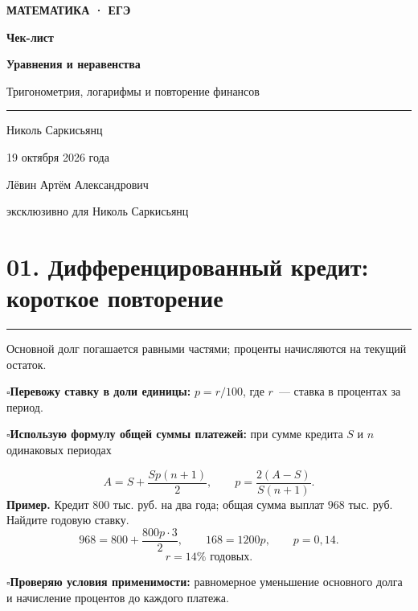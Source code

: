 \documentclass[a4paper,12pt]{article}
\newcommand{\sectionnote}[1]{{\small\color{softgray}#1\par}}
\newcommand{\criterion}[1]{\textcolor{darkaccent}{\bfseries #1}}
\newcommand{\checkitem}[1]{\par\noindent\textcolor{accent}{\(\square\)}\enspace #1\par}
\newcommand{\lessonsection}[1]{\Needspace{5\baselineskip}\section*{\color{darkaccent}#1}\vspace{-5pt}\noindent\textcolor{accent}{\rule{25mm}{0.7pt}}\par\vspace{1pt}}
\begin{document}
\thispagestyle{empty}
\begin{titlepage}
\begin{center}
\vspace*{27mm}
{\large\color{darkaccent}\bfseries МАТЕМАТИКА · ЕГЭ}\par
\vspace{27mm}
{\Huge\bfseries Чек-лист}\par
\vspace{9mm}
{\LARGE\color{darkaccent}\bfseries Уравнения и неравенства}\par
\vspace{4mm}
{\Large Тригонометрия, логарифмы и повторение финансов}\par
\vspace{20mm}
\textcolor{accent}{\rule{34mm}{0.7pt}}\par
\vspace{15mm}
{\large Николь Саркисьянц}\par
\vspace{6mm}
{\large 19 октября 2026 года}\par
\vfill
{\small\color{textgray}Лёвин Артём Александрович}\par
{\small\color{textgray}эксклюзивно для Николь Саркисьянц}\par
\vspace{17mm}
\end{center}
\end{titlepage}

\lessonsection{01. Дифференцированный кредит: короткое повторение}
\sectionnote{Основной долг погашается равными частями; проценты начисляются на текущий остаток.}
\checkitem{\criterion{Перевожу ставку в доли единицы:} \(p=r/100\), где \(r\)~--- ставка в процентах за период.}
\checkitem{\criterion{Использую формулу общей суммы платежей:} при сумме кредита \(S\) и \(n\) одинаковых периодах}
\[
\boxed{A=S+\frac{Sp(n+1)}2},\qquad
\boxed{p=\frac{2(A-S)}{S(n+1)}}.
\]
\textbf{Пример.} Кредит \(800\) тыс. руб. на два года; общая сумма выплат \(968\) тыс. руб. Найдите годовую ставку.
\[
968=800+\frac{800p\cdot3}{2},\qquad
168=1200p,\qquad p=0{,}14.
\]
\[
\boxed{r=14\%\text{ годовых}}.
\]
\checkitem{\criterion{Проверяю условия применимости:} равномерное уменьшение основного долга и начисление процентов до каждого платежа.}
\end{document}
